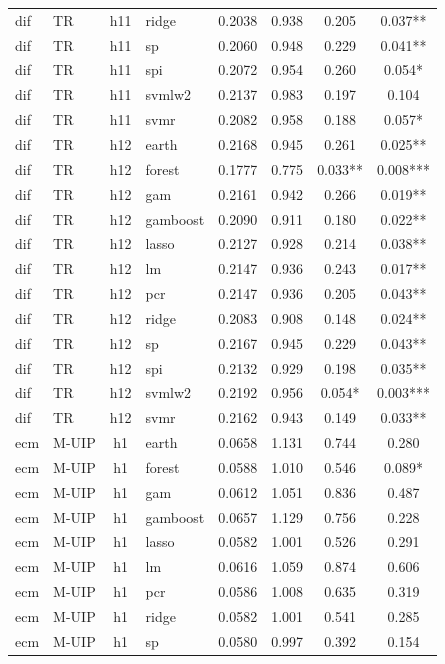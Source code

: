 \begin{ThreePartTable}
\begin{longtable}[t]{llclcccc}
dif & TR & h11 & ridge & 0.2038 & 0.938 & 0.205 & 0.037**\\
dif & TR & h11 & sp & 0.2060 & 0.948 & 0.229 & 0.041**\\
dif & TR & h11 & spi & 0.2072 & 0.954 & 0.260 & 0.054*\\
dif & TR & h11 & svmlw2 & 0.2137 & 0.983 & 0.197 & 0.104\\
dif & TR & h11 & svmr & 0.2082 & 0.958 & 0.188 & 0.057*\\
\addlinespace
dif & TR & h12 & earth & 0.2168 & 0.945 & 0.261 & 0.025**\\
dif & TR & h12 & forest & 0.1777 & 0.775 & 0.033** & 0.008***\\
dif & TR & h12 & gam & 0.2161 & 0.942 & 0.266 & 0.019**\\
dif & TR & h12 & gamboost & 0.2090 & 0.911 & 0.180 & 0.022**\\
dif & TR & h12 & lasso & 0.2127 & 0.928 & 0.214 & 0.038**\\
dif & TR & h12 & lm & 0.2147 & 0.936 & 0.243 & 0.017**\\
dif & TR & h12 & pcr & 0.2147 & 0.936 & 0.205 & 0.043**\\
dif & TR & h12 & ridge & 0.2083 & 0.908 & 0.148 & 0.024**\\
dif & TR & h12 & sp & 0.2167 & 0.945 & 0.229 & 0.043**\\
dif & TR & h12 & spi & 0.2132 & 0.929 & 0.198 & 0.035**\\
dif & TR & h12 & svmlw2 & 0.2192 & 0.956 & 0.054* & 0.003***\\
dif & TR & h12 & svmr & 0.2162 & 0.943 & 0.149 & 0.033**\\
\addlinespace
ecm & M-UIP & h1 & earth & 0.0658 & 1.131 & 0.744 & 0.280\\
ecm & M-UIP & h1 & forest & 0.0588 & 1.010 & 0.546 & 0.089*\\
ecm & M-UIP & h1 & gam & 0.0612 & 1.051 & 0.836 & 0.487\\
ecm & M-UIP & h1 & gamboost & 0.0657 & 1.129 & 0.756 & 0.228\\
ecm & M-UIP & h1 & lasso & 0.0582 & 1.001 & 0.526 & 0.291\\
ecm & M-UIP & h1 & lm & 0.0616 & 1.059 & 0.874 & 0.606\\
ecm & M-UIP & h1 & pcr & 0.0586 & 1.008 & 0.635 & 0.319\\
ecm & M-UIP & h1 & ridge & 0.0582 & 1.001 & 0.541 & 0.285\\
ecm & M-UIP & h1 & sp & 0.0580 & 0.997 & 0.392 & 0.154\\

\end{longtable}
\end{ThreePartTable}
